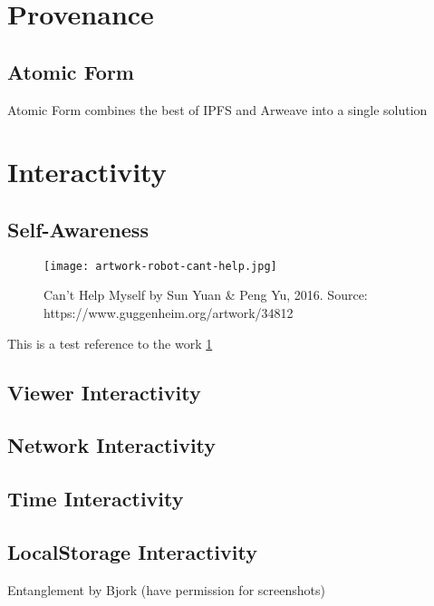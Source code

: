 \section{Provenance}

\subsection{Atomic Form}

Atomic Form combines the best of IPFS and Arweave into a single solution \cite{maneliusExtendingNFTMetadata2024}




\section{Interactivity}

\subsection{Self-Awareness}

\begin{figure}[h]
    \centering
    \texttt{[image: artwork-robot-cant-help.jpg]}
    \caption[Can’t Help Myself by Sun Yuan \& Peng Yu]{Can’t Help Myself by Sun Yuan \& Peng Yu, 2016. Source: https://www.guggenheim.org/artwork/34812}
    \label{fig:robot-canthelp}
\end{figure}


This is a test reference to the work \cref{fig:robot-canthelp}

\subsection{Viewer Interactivity}

\subsection{Network Interactivity}

\subsection{Time Interactivity}


\subsection{LocalStorage Interactivity}

Entanglement by Bjork (have permission for screenshots)

